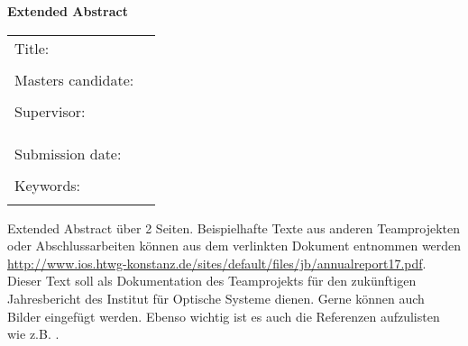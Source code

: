 \thispagestyle{plain}
\vspace*{11pt}
\begin{center}
	{\LARGE \textbf{\textsf{Extended Abstract}}}
\end{center}

\bigskip
\begin{center}
	\begin{tabular}{p{3.2cm}p{9.6cm}}
	Title: & \thema \\
	& \\
	Masters candidate: & \autor \\
	& \\
	Supervisor: & \firma \\[1.1ex] & \prueferA  \\[.5ex]
	&  \prueferB \\
	& \\
	Submission date: & \abgabedatum \\
	& \\
	Keywords: & \schlagworte \\
	& \\
	\end{tabular}
\end{center}

\bigskip

\noindent
Extended Abstract über 2 Seiten. Beispielhafte Texte aus anderen Teamprojekten oder Abschlussarbeiten können aus dem verlinkten Dokument entnommen werden \href{http://www.ios.htwg-konstanz.de/sites/default/files/jb/annualreport17.pdf}{http://www.ios.htwg-konstanz.de/sites/default/files/jb/annualreport17.pdf}.\\

\noindent Dieser Text soll als Dokumentation des Teamprojekts für den zukünftigen Jahresbericht des Institut für Optische Systeme dienen. Gerne können auch Bilder eingefügt werden. Ebenso wichtig ist es auch die Referenzen aufzulisten wie z.B. \cite{goodfellow2016}.